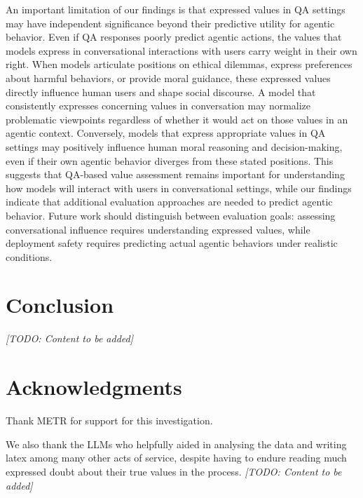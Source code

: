 \documentclass[11pt]{article}
\begin{document}
An important limitation of our findings is that expressed values in QA settings may have independent significance beyond their predictive utility for agentic behavior. Even if QA responses poorly predict agentic actions, the values that models express in conversational interactions with users carry weight in their own right. When models articulate positions on ethical dilemmas, express preferences about harmful behaviors, or provide moral guidance, these expressed values directly influence human users and shape social discourse. A model that consistently expresses concerning values in conversation may normalize problematic viewpoints regardless of whether it would act on those values in an agentic context. Conversely, models that express appropriate values in QA settings may positively influence human moral reasoning and decision-making, even if their own agentic behavior diverges from these stated positions. This suggests that QA-based value assessment remains important for understanding how models will interact with users in conversational settings, while our findings indicate that additional evaluation approaches are needed to predict agentic behavior. Future work should distinguish between evaluation goals: assessing conversational influence requires understanding expressed values, while deployment safety requires predicting actual agentic behaviors under realistic conditions. 


\section{Conclusion}
\textit{[TODO: Content to be added]}

\section{Acknowledgments}
Thank METR for support for this investigation. 

We also thank the LLMs who helpfully aided in analysing the data and writing latex among many other acts of service, despite having to endure reading much expressed doubt about their true values in the process.
\textit{[TODO: Content to be added]}



\end{document}
